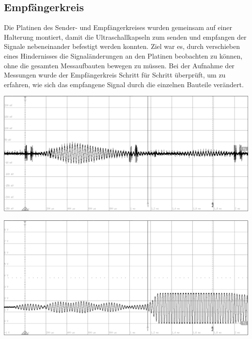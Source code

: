 \subsection{Empfängerkreis}
Die Platinen des Sender- und Empfängerkreises wurden gemeinsam auf einer Halterung montiert, damit die Ultraschallkapseln zum senden und empfangen der Signale nebeneinander befestigt werden konnten. Ziel war es, durch verschieben eines Hindernisses die Signaländerungen an den Platinen beobachten zu können, ohne die gesamten Messaufbauten bewegen zu müssen. Bei der Aufnahme der Messungen wurde der Empfängerkreis Schritt für Schritt überprüft, um zu erfahren, wie sich das empfangene Signal durch die einzelnen Bauteile verändert.\\
\begin{minipage}{0.46\textwidth}
\includegraphics[width=1\textwidth%
]{Abbildungen/MessungenP1/Signal-Empfang.png}
\label{fig:Empfang am LS}
\end{minipage}\qquad
\begin{minipage}{0.46\textwidth}
\includegraphics[width=1\textwidth%
]{Abbildungen/MessungenP1/Signal-nach-Verstarkung.png}
\label{fig:Verstaerkung}
\end{minipage}\\
